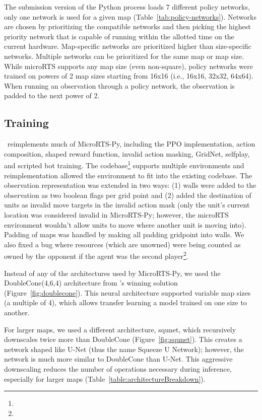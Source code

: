 \documentclass{article}
\begin{document}
The submission version of the Python process loads 7 different policy networks, only one network is used
for a given map (Table~\ref{tab:policy-networks}). Networks are chosen by prioritizing
the compatible networks and then picking the highest priority network that is capable of
running within the allotted time on the current hardware. Map-specific networks are
prioritized higher than size-specific networks. Multiple networks can be prioritized for
the same map or map size. While microRTS supports any map size (even non-square), policy networks were trained on
powers of 2 map sizes starting from 16x16 (i.e., 16x16, 32x32, 64x64). When running an
observation through a policy network, the observation is padded to the next power of 2.

\subsection{Training}
\agentName\ reimplements much of MicroRTS-Py, including the PPO implementation, action
composition, shaped reward function, invalid action masking, GridNet, selfplay, and
scripted bot training. The codebase\footnote{\rlAlgoImplsGitHubUrl} supports multiple environments and reimplementation
allowed the environment to fit into the existing codebase. The observation
representation was extended in two ways: (1) walls were added to the observation as two
boolean flags per grid point and (2) added the destination of units as invalid move
targets in the invalid action mask (only the unit's current location was considered
invalid in MicroRTS-Py; however, the microRTS environment wouldn't allow units to move
where another unit is moving into). Padding of maps was handled by making all padding
gridpoint into walls. We also fixed a bug where resources (which are unowned) were being counted as owned by
the opponent if the agent was the second player\footnote{\unownedFixGitHubCommit}.

Instead of any of the architectures used by MicroRTS-Py, we used the DoubleCone(4,6,4)
architecture from \citet{Ferdinand2021doublecone}'s winning solution (Figure~\ref{fig:doublecone}). This neural
architecture supported variable map sizes (a multiple of 4), which allows transfer
learning a model trained on one size to another.

For larger maps, we used a different architecture, squnet, which recursively downscales
twice more than DoubleCone (Figure~\ref{fig:squnet}). This creates a network shaped like U-Net (thus the name
Squeeze U Network); however, the network is much more similar to DoubleCone than U-Net.
This aggressive downscaling reduces the number of operations necessary during inference,
especially for larger maps (Table~\ref{table:architectureBreakdown}).
\end{document}
